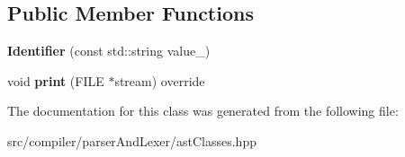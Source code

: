 \subsection*{Public Member Functions}
\begin{DoxyCompactItemize}
\item 
{\bfseries Identifier} (const std\+::string value\+\_\+)\hypertarget{classslang__AST__NODES_1_1Identifier_a0d0049f7138996421c62abdd486cc0bc}{}\label{classslang__AST__NODES_1_1Identifier_a0d0049f7138996421c62abdd486cc0bc}

\item 
void {\bfseries print} (F\+I\+LE $\ast$stream) override\hypertarget{classslang__AST__NODES_1_1Identifier_ad40c1bcac8d970fa97337fac84e70873}{}\label{classslang__AST__NODES_1_1Identifier_ad40c1bcac8d970fa97337fac84e70873}

\end{DoxyCompactItemize}


The documentation for this class was generated from the following file\+:\begin{DoxyCompactItemize}
\item 
src/compiler/parser\+And\+Lexer/ast\+Classes.\+hpp\end{DoxyCompactItemize}
